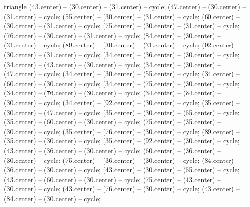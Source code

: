 \begin{pgfonlayer}{triangle}
 (43.center) -- (30.center) -- (31.center) -- cycle; 
 (47.center) -- (30.center) -- (31.center) -- cycle; 
 (55.center) -- (30.center) -- (31.center) -- cycle; 
 (60.center) -- (30.center) -- (31.center) -- cycle; 
 (75.center) -- (30.center) -- (31.center) -- cycle; 
 (76.center) -- (30.center) -- (31.center) -- cycle; 
 (84.center) -- (30.center) -- (31.center) -- cycle; 
 (89.center) -- (30.center) -- (31.center) -- cycle; 
 (92.center) -- (30.center) -- (31.center) -- cycle; 
 (34.center) -- (36.center) -- (30.center) -- cycle; 
 (34.center) -- (43.center) -- (30.center) -- cycle; 
 (34.center) -- (30.center) -- (47.center) -- cycle; 
 (34.center) -- (30.center) -- (55.center) -- cycle; 
 (34.center) -- (60.center) -- (30.center) -- cycle; 
 (34.center) -- (75.center) -- (30.center) -- cycle; 
 (34.center) -- (76.center) -- (30.center) -- cycle; 
 (34.center) -- (84.center) -- (30.center) -- cycle; 
 (34.center) -- (92.center) -- (30.center) -- cycle; 
 (35.center) -- (30.center) -- (47.center) -- cycle; 
 (35.center) -- (30.center) -- (55.center) -- cycle; 
 (35.center) -- (60.center) -- (30.center) -- cycle; 
 (75.center) -- (35.center) -- (30.center) -- cycle; 
 (35.center) -- (76.center) -- (30.center) -- cycle; 
 (89.center) -- (35.center) -- (30.center) -- cycle; 
 (35.center) -- (92.center) -- (30.center) -- cycle; 
 (43.center) -- (36.center) -- (30.center) -- cycle; 
 (60.center) -- (36.center) -- (30.center) -- cycle; 
 (75.center) -- (36.center) -- (30.center) -- cycle; 
 (84.center) -- (36.center) -- (30.center) -- cycle; 
 (43.center) -- (30.center) -- (55.center) -- cycle; 
 (43.center) -- (60.center) -- (30.center) -- cycle; 
 (75.center) -- (43.center) -- (30.center) -- cycle; 
 (43.center) -- (76.center) -- (30.center) -- cycle; 
 (43.center) -- (84.center) -- (30.center) -- cycle; 

\end{pgfonlayer}
